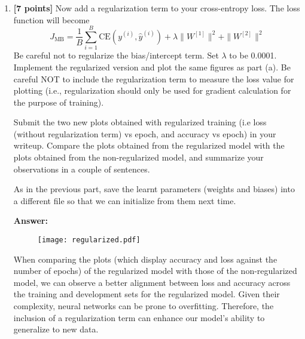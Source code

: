 \documentclass{article}
\begin{document}
\begin{enumerate}[label=(\alph*)]




\item \textbf{[7 points]} Now add a regularization term to your cross-entropy loss. The loss function will become
\[ 
J_{\text{MB}} = \frac{1}{B} \sum_{i=1}^{B} \text{CE}(y^{(i)}, \hat{y}^{(i)}) + \lambda \|W^{[1]}\|^2 + \|W^{[2]}\|^2
\]
Be careful not to regularize the bias/intercept term. Set $\lambda$ to be 0.0001. Implement the regularized version and plot the same figures as part (a). Be careful NOT to include the regularization term to measure the loss value for plotting (i.e., regularization should only be used for gradient calculation for the purpose of training).

Submit the two new plots obtained with regularized training (i.e loss (without regularization term) vs epoch, and accuracy vs epoch) in your writeup. Compare the plots obtained from the regularized model with the plots obtained from the non-regularized model, and summarize your observations in a couple of sentences.

As in the previous part, save the learnt parameters (weights and biases) into a different file so that we can initialize from them next time.


\textbf{Answer:}


\begin{figure}[H]
    \centering
    \texttt{[image: regularized.pdf]}
    \label{fig:regularized}
\end{figure}

When comparing the plots (which display accuracy and loss against the number of epochs) of the regularized model with those of the non-regularized model, we can observe a better alignment between loss and accuracy across the training and development sets for the regularized model. Given their complexity, neural networks can be prone to overfitting. Therefore, the inclusion of a regularization term can enhance our model's ability to generalize to new data.


\end{enumerate}
\end{document}
